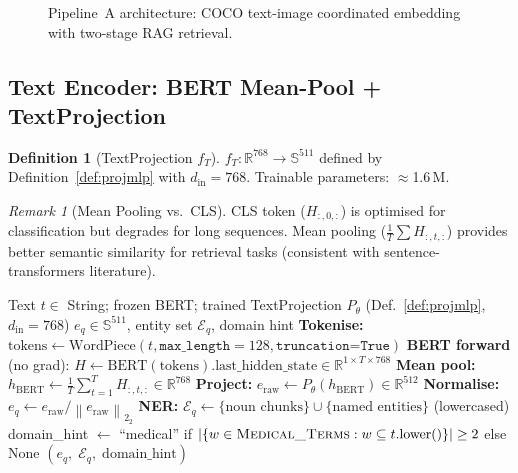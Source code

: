 \documentclass[12pt,a4paper]{article}
\theoremstyle{definition}
\newtheorem{definition}{Definition}[section]
\theoremstyle{plain}
\theoremstyle{remark}
\newtheorem{remark}{Remark}[section]
\newcommand{\R}{\mathbb{R}}
\newcommand{\Sph}{\mathbb{S}}
\newcommand{\Norm}[1]{\left\|#1\right\|_2}
\begin{document}
\begin{figure}[H]
{
}
\caption{Pipeline~A architecture: COCO text-image coordinated embedding with two-stage RAG retrieval.}
\label{fig:pipeline_a}
\end{figure}

\subsection{Text Encoder: BERT Mean-Pool + TextProjection}

\begin{definition}[TextProjection $f_T$]
$f_T : \R^{768} \to \Sph^{511}$ defined by Definition~\ref{def:projmlp} with $d_{\text{in}} = 768$. Trainable parameters: $\approx$1.6\,M.
\end{definition}

\begin{remark}[Mean Pooling vs.\ CLS]
CLS token ($H_{:,0,:}$) is optimised for classification but degrades for long sequences. Mean pooling ($\frac{1}{T}\sum H_{:,t,:}$) provides better semantic similarity for retrieval tasks (consistent with sentence-transformers literature).
\end{remark}

\begin{algorithm}[H]
\caption{TextEncoderV2.encode --- BERT Mean-Pool + TextProjection}
\label{alg:textencode}
\begin{algorithmic}[1]
\Require Text $t \in$ String; frozen BERT; trained TextProjection $P_\theta$ (Def.~\ref{def:projmlp}, $d_{\text{in}}=768$)
\Ensure $e_q \in \Sph^{511}$, entity set $\mathcal{E}_q$, domain hint
\State \textbf{Tokenise:} $\text{tokens} \gets \text{WordPiece}(t, \texttt{max\_length}=128, \texttt{truncation=True})$
\State \textbf{BERT forward} (no grad):
  $H \gets \text{BERT}(\text{tokens}).\text{last\_hidden\_state} \in \R^{1 \times T \times 768}$
\State \textbf{Mean pool:} $h_{\text{BERT}} \gets \frac{1}{T}\sum_{t=1}^T H_{:,t,:} \in \R^{768}$
\State \textbf{Project:} $e_{\text{raw}} \gets P_\theta(h_{\text{BERT}}) \in \R^{512}$
\State \textbf{Normalise:} $e_q \gets e_{\text{raw}} / \Norm{e_{\text{raw}}}_2$
\State \textbf{NER:} $\mathcal{E}_q \gets \{\text{noun chunks}\} \cup \{\text{named entities}\}$ (lowercased)
\State domain\_hint $\gets$ ``medical'' if $|\{w \in \textsc{Medical\_Terms} : w \subseteq t.\text{lower}()\}| \ge 2$ else None
\State \Return $(e_q,\; \mathcal{E}_q,\; \text{domain\_hint})$
\end{algorithmic}
\end{algorithm}
\end{document}
